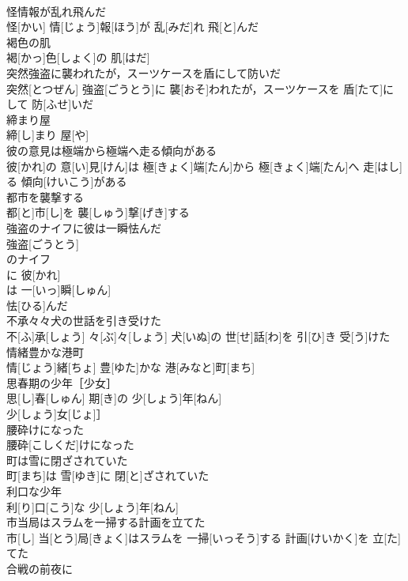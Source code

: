 \documentclass[8pt]{extreport}
\begin{document}
\begin{CJK}{UTF8}{min}
\\	怪情報が乱れ飛んだ	
\\	怪[かい] 情[じょう]報[ほう]が 乱[みだ]れ 飛[と]んだ
\\	褐色の肌	
\\	褐[かっ]色[しょく]の 肌[はだ]
\\	突然強盗に襲われたが，スーツケースを盾にして防いだ	
\\	突然[とつぜん] 強盗[ごうとう]に 襲[おそ]われたが，スーツケースを 盾[たて]にして 防[ふせ]いだ
\\	締まり屋	
\\	締[し]まり 屋[や]
\\	彼の意見は極端から極端へ走る傾向がある	
\\	彼[かれ]の 意[い]見[けん]は 極[きょく]端[たん]から 極[きょく]端[たん]へ 走[はし]る 傾向[けいこう]がある
\\	都市を襲撃する	
\\	都[と]市[し]を 襲[しゅう]撃[げき]する
\\	強盗のナイフに彼は一瞬怯んだ	
\\	強盗[ごうとう]
\\	のナイフ 
\\	に 彼[かれ]
\\	は 一[いっ]瞬[しゅん]
\\	怯[ひる]んだ 
\\	不承々々犬の世話を引き受けた	
\\	不[ふ]承[しょう] 々[ぶ]々[しょう] 犬[いぬ]の 世[せ]話[わ]を 引[ひ]き 受[う]けた
\\	情緒豊かな港町	
\\	情[じょう]緒[ちょ] 豊[ゆた]かな 港[みなと]町[まち]
\\	思春期の少年［少女］	
\\	思[し]春[しゅん] 期[き]の 少[しょう]年[ねん]
\\	少[しょう]女[じょ]］
\\	腰砕けになった	
\\	腰砕[こしくだ]けになった
\\	町は雪に閉ざされていた	
\\	町[まち]は 雪[ゆき]に 閉[と]ざされていた
\\	利口な少年	
\\	利[り]口[こう]な 少[しょう]年[ねん]
\\	市当局はスラムを一掃する計画を立てた	
\\	市[し] 当[とう]局[きょく]はスラムを 一掃[いっそう]する 計画[けいかく]を 立[た]てた
\\	合戦の前夜に	

\end{CJK}
\end{document}
